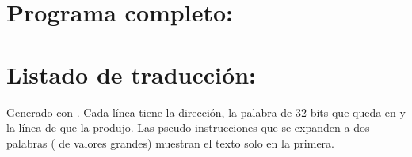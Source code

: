\section{Programa completo: }
\label{anx:game}



\newpage
\section{Listado de traducción: }
\label{anx:listado}

Generado con .
Cada línea tiene la dirección, la palabra de 32 bits que queda en  y la
línea de  que la produjo. Las pseudo-instrucciones que se expanden a dos
palabras ( de valores grandes) muestran el texto solo en la primera.

{\scriptsize

}
